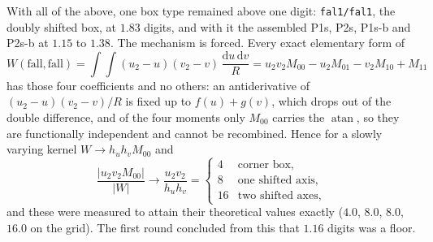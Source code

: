 \documentclass[11pt]{article}
\theoremstyle{remark}
\newcommand{\dd}{\mathrm{d}}
\newcommand{\atan}{\operatorname{atan}}
\newcommand{\code}[1]{\texttt{#1}}
\begin{document}
With all of the above, one box type remained above one digit: \code{fal1/fal1}, the doubly
shifted box, at $1.83$ digits, and with it the assembled P1s, P2s, P1s-b and P2s-b at
$1.15$ to $1.38$. The mechanism is forced. Every exact elementary form of
\begin{equation}
W(\text{fall},\text{fall}) = \int\!\!\int (u_2-u)(v_2-v)\,\frac{\dd u\,\dd v}{R}
 = u_2v_2 M_{00} - u_2 M_{01} - v_2 M_{10} + M_{11}
\end{equation}
has those four coefficients and no others: an antiderivative of $(u_2-u)(v_2-v)/R$ is
fixed up to $f(u)+g(v)$, which drops out of the double difference, and of the four moments
only $M_{00}$ carries the $\atan$, so they are functionally independent and cannot be
recombined. Hence for a slowly varying kernel $W \to h_uh_v M_{00}$ and
\begin{equation}
\frac{|u_2v_2M_{00}|}{|W|} \longrightarrow \frac{u_2v_2}{h_uh_v} =
\begin{cases} 4 & \text{corner box},\\ 8 & \text{one shifted axis},\\ 16 & \text{two shifted axes},\end{cases}
\end{equation}
and these were measured to attain their theoretical values exactly ($4.0$, $8.0$, $8.0$,
$16.0$ on the grid). The first round concluded from this that $1.16$ digits was a floor.
\end{document}
